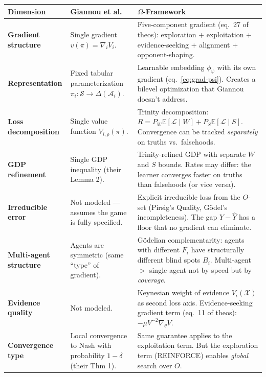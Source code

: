 \documentclass[11pt,a4paper]{article}
\newcommand{\E}{\mathbb{E}}
\newcommand{\calL}{\mathcal{L}}
\newcommand{\calX}{\mathcal{X}}
\begin{document}
\begin{center}
\renewcommand{\arraystretch}{1.4}
\begin{tabular}{p{3.5cm}p{5cm}p{5cm}}
\toprule
\textbf{Dimension} & \textbf{Giannou et al.} & \textbf{$\Omega$-Framework} \\
\midrule
\textbf{Gradient structure} & Single gradient $v(\pi) = \nabla_i V_i$. & Five-component gradient (eq.\ 27 of theos): exploration + exploitation + evidence-seeking + alignment + opponent-shaping. \\

\textbf{Representation} & Fixed tabular parameterization $\pi_i : \mathcal{S} \to \Delta(\mathcal{A}_i)$. & Learnable embedding $\phi_\psi$ with its own gradient (eq.~\ref{eq:grad-psi}). Creates a bilevel optimization that Giannou doesn't address. \\

\textbf{Loss decomposition} & Single value function $V_{i,\rho}(\pi)$. & Trinity decomposition: $R = P_W \E[\calL \mid W] + P_S \E[\calL \mid S]$. Convergence can be tracked \emph{separately} on truths vs.\ falsehoods. \\

\textbf{GDP refinement} & Single GDP inequality (their Lemma 2). & Trinity-refined GDP with separate $W$ and $S$ bounds. Rates may differ: the learner converges faster on truths than falsehoods (or vice versa). \\

\textbf{Irreducible error} & Not modeled — assumes the game is fully specified. & Explicit irreducible loss from the $O$-set (Pirsig's Quality, G\"odel's incompleteness). The gap $Y - \hat{Y}$ has a floor that no gradient can eliminate. \\

\textbf{Multi-agent structure} & Agents are symmetric (same ``type'' of gradient). & G\"odelian complementarity: agents with different $F_i$ have structurally different blind spots $B_i$. Multi-agent $>$ single-agent not by speed but by \emph{coverage}. \\

\textbf{Evidence quality} & Not modeled. & Keynesian weight of evidence $V_i(\calX)$ as second loss axis. Evidence-seeking gradient term (eq.\ 11 of theos): $-\mu V^{-2} \nabla_\theta V$. \\

\textbf{Convergence type} & Local convergence to Nash with probability $1 - \delta$ (their Thm 1). & Same guarantee applies to the exploitation term. But the exploration term (REINFORCE) enables \emph{global} search over $O$. \\
\bottomrule
\end{tabular}
\end{center}
\end{document}
